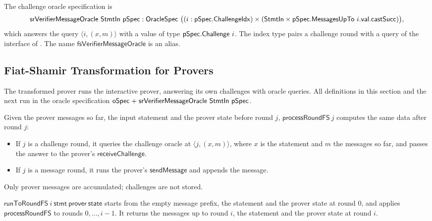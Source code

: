 \begin{definition}
    \label{def:fiat_shamir_spec}
    The challenge oracle specification is
    \[ \mathsf{srVerifierMessageOracle}\ \mathsf{StmtIn}\ \mathsf{pSpec} : \mathsf{OracleSpec}\ \big((i : \mathsf{pSpec}.\mathsf{ChallengeIdx}) \times (\mathsf{StmtIn} \times \mathsf{pSpec}.\mathsf{MessagesUpTo}\ i.\mathsf{val}.\mathsf{castSucc})\big), \]
    which answers the query $\langle i, (x, m) \rangle$ with a value of type $\pSpec.\Challenge\ i$.
    The index type pairs a challenge round with a query of the interface of
    . The name $\mathsf{fsVerifierMessageOracle}$ is an
    alias.
    \leanok
\end{definition}

\subsection{Fiat-Shamir Transformation for Provers}\label{sec:fiat_shamir_prover}

The transformed prover runs the interactive prover, answering its own challenges with oracle
queries. All definitions in this section and the next run in the oracle specification
$\oSpec \mathrel{+} \mathsf{srVerifierMessageOracle}\ \StmtIn\ \pSpec$.

\begin{definition}
    \label{def:prover_process_round_fs}
    Given the prover messages so far, the input statement and the prover state before round $j$,
    $\mathsf{processRoundFS}\ j$ computes the same data after round $j$:
    \begin{itemize}
        \item If $j$ is a challenge round, it queries the challenge oracle at
        $\langle j, (x, m) \rangle$, where $x$ is the statement and $m$ the messages so far, and
        passes the answer to the prover's $\mathsf{receiveChallenge}$.
        \item If $j$ is a message round, it runs the prover's $\mathsf{sendMessage}$ and appends
        the message.
    \end{itemize}
    Only prover messages are accumulated; challenges are not stored.
    \leanok
\end{definition}

\begin{definition}
    \label{def:prover_run_to_round_fs}
    $\mathsf{runToRoundFS}\ i\ \mathsf{stmt}\ \mathsf{prover}\ \mathsf{state}$ starts from the
    empty message prefix, the statement and the prover state at round $0$, and applies
    $\mathsf{processRoundFS}$ to rounds $0, \ldots, i - 1$. It returns the messages up to round
    $i$, the statement and the prover state at round $i$.
    \leanok
\end{definition}

